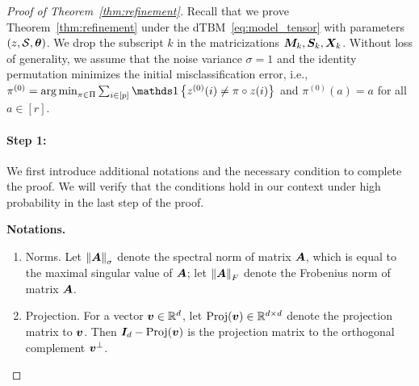 \documentclass[lettersize,journal]{IEEEtran}
\theoremstyle{definition}
\theoremstyle{definition}
\newcommand{\offf}[1]{\left\{#1\right\}}
\begin{document}
\begin{proof}[Proof of Theorem~\ref{thm:refinement}]
Recall that we prove Theorem~\ref{thm:refinement} under the dTBM~\ref{eq:model_tensor} with parameters $(z, \mathcal{S}, \boldsymbol{\theta})$. We drop the subscript $k$ in the matricizations $\bm M_k, \bm S_k, \bm X_k$. Without loss of generality, we assume that the noise variance $\sigma = 1$ and the identity permutation minimizes the initial misclassification error, i.e., $\pi^{(0)} = \argmin_{\pi \in \Pi} \sum_{i \in [p]}\ind \offf{z^{(0)}(i) \neq \pi \circ z(i) }$ and $\pi^{(0)}(a) = a$ for all $ a \in [r]$.



\paragraph{Step 1:} We first introduce additional notations and the necessary condition to complete the proof. We will verify that the conditions hold in our context under high probability in the last step of the proof. 

\textbf{Notations.}
\begin{enumerate}

\item Norms. Let $\left\lVert\bm A\right\rVert_\sigma$ denote the spectral norm of matrix $\bm A$, which is equal to the maximal singular value of $\bm A$; let $\left\lVert\bm A\right\rVert_F$ denote the Frobenius norm of matrix $\bm A$.
\item Projection. For a vector $\bm{v} \in \mathbb{R}^d$, let $\text{Proj}(\bm{v}) \in \mathbb{R}^{d \times d}$ denote the projection matrix to $\bm{v}$. Then $\bm I_d - \text{Proj}(\bm{v})$ is the projection matrix to the orthogonal complement $\bm{v}^{\perp}$. 


\end{enumerate}
\end{proof}
\end{document}
